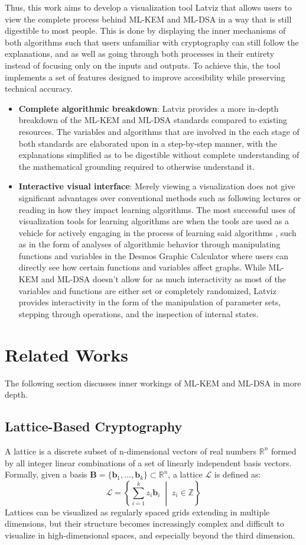 \documentclass[runningheads]{llncs}
\begin{document}
Thus, this work aims to develop a visualization tool Latviz that allows users to view the complete process behind ML-KEM and ML-DSA in a way that is still digestible to most people. This is done by displaying the inner mechanisms of both algorithms such that users unfamiliar with cryptography can still follow the explanations, and as well as going through both processes in their entirety instead of focusing only on the inputs and outputs. To achieve this, the tool implements a set of features designed to improve accesibility while preserving technical accuracy.
\begin{itemize}
\item \textbf{Complete algorithmic breakdown}: Latviz provides a more in-depth breakdown of the ML-KEM and ML-DSA standards compared to existing resources. The variables and algorithms that are involved in the each stage of both standards are elaborated upon in a step-by-step manner, with the explanations simplified as to be digestible without complete understanding of the mathematical grounding required to otherwise understand it.
\item \textbf{Interactive visual interface}: Merely viewing a visualization does not give significant advantages over conventional methods such as following lectures or reading in how they impact learning algorithms. The most successful uses of visualization tools for learning algorithms are when the tools are used as a vehicle for  actively engaging in the process of learning said algorithms \cite{HUNDHAUSEN2002259}, such as in the form of analyses of algorithmic behavior through manipulating functions and variables in the Desmos Graphic Calculator where users can directly see how certain functions and variables affect graphs. While ML-KEM and ML-DSA doesn't allow for as much interactivity as most of the variables and functions are either set or completely randomized, Latviz provides interactivity in the form of the manipulation of parameter sets, stepping through operations, and the inspection of internal states.
\end{itemize}

\section{Related Works}
The following section discusses inner workings of ML-KEM and ML-DSA in more depth.

\subsection{Lattice-Based Cryptography}
A lattice is a discrete subset of n-dimensional vectors of real numbers $\mathbb{R}^n$ formed by all integer linear combinations of a set of linearly independent basis vectors. Formally, given a basis $\mathbf{B} = \{ \mathbf{b}_1, \dots, \mathbf{b}_k \} \subset \mathbb{R}^n$, a lattice $\mathcal{L}$ is defined as:
\[
\mathcal{L} = \left\{ \sum_{i=1}^{k} z_i \mathbf{b}_i \;\middle|\; z_i \in \mathbb{Z} \right\}
\]
Lattices can be visualized as regularly spaced grids extending in multiple dimensions, but their structure becomes increasingly complex and difficult to visualize in high-dimensional spaces, and especially beyond the third dimension.
\end{document}
